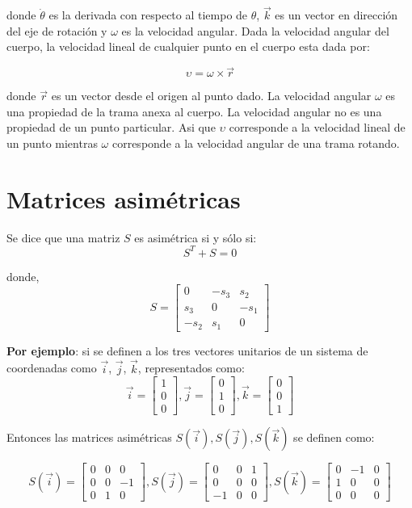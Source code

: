 \documentclass[10pt,a4paper]{article}
\begin{document}
donde $\dot{\theta}$ es la derivada con respecto al tiempo de $\theta$, $\vec{k}$ es un vector en dirección del eje de rotación y $\omega$ es la velocidad angular. Dada la velocidad angular del cuerpo, la velocidad lineal de cualquier punto en el cuerpo esta dada por:

$$ \upsilon = \omega \times \vec{r}$$

donde $\vec{r}$ es un vector desde el origen al punto dado. La velocidad angular $\omega$ es una propiedad de la trama anexa al cuerpo. La velocidad angular no es una propiedad de un punto particular. Asi que $\upsilon$ corresponde a la velocidad lineal de un punto mientras $\omega$ corresponde a la velocidad angular de una trama rotando.

\section{Matrices asimétricas}
Se dice que una matriz $S$ es asimétrica si y sólo si:
$$ S^T + S = 0$$

donde,
$$
	S =
	\begin{bmatrix}
		0    & -s_3 & s_2\\
		s_3  & 0    & -s_1\\
		-s_2 & s_1  & 0
	\end{bmatrix}
$$

\textbf{Por ejemplo}: si se definen a los tres vectores unitarios de un sistema de coordenadas como $\vec{i}$, $\vec{j}$, $\vec{k}$, representados como:
$$
	\vec{i} =
	\begin{bmatrix}
		1 \\ 0 \\ 0
	\end{bmatrix},
	\vec{j} =
	\begin{bmatrix}
		0 \\ 1 \\ 0
	\end{bmatrix},
	\vec{k} =
	\begin{bmatrix}
		0 \\ 0 \\ 1
	\end{bmatrix}
$$

Entonces las matrices asimétricas $S(\vec{i}), S(\vec{j}), S(\vec{k})$ se definen como:

$$
	S(\vec{i}) =
	\begin{bmatrix}
		0 & 0 & 0 \\
		0 & 0 & -1\\
		0 & 1 & 0
	\end{bmatrix},
	S(\vec{j}) =
	\begin{bmatrix}
		0 & 0 & 1 \\
		0 & 0 & 0\\
		-1& 0 & 0
	\end{bmatrix},
	S(\vec{k}) =
	\begin{bmatrix}
		0 & -1 & 0 \\
		1 & 0 & 0\\
		0 & 0 & 0
	\end{bmatrix}
$$
\end{document}
